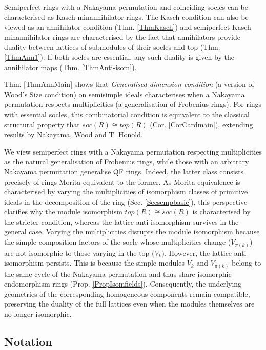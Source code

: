 \documentclass[11pt]{article}
\theoremstyle{plain}
\theoremstyle{remark}
\theoremstyle{plain}
\begin{document}
Semiperfect rings with a Nakayama permutation and coinciding socles can be characterised as Kasch minannihilator rings. The Kasch condition can also be viewed as an annihilator condition  (Thm. \ref{ThmKasch}) and semiperfect Kasch minannihilator rings are characterised by the fact that annihilators provide duality between lattices of submodules of their socles and top (Thm. \ref{ThmAnn1}). If both socles are essential, any such duality is given by the annihilator maps (Thm. \ref{ThmAnti-isom}). 

 Thm. \ref{ThmAnnMain} shows that \textit{Generalised dimension condition} (a version of Wood's Size condition) on semisimple ideals characterises when a Nakayama permutation respects multiplicities (a generalisation of Frobenius rings). For rings with essential socles, this combinatorial condition is equivalent to the classical structural property that $soc(R)\cong top(R)$ (Cor. \ref{CorCardmain}), extending results by Nakayama, Wood and T. Honold.

We view semiperfect rings with a Nakayama permutation respecting multiplicities as the natural generalisation of Frobenius rings, while those with an arbitrary Nakayama permutation generalise QF rings. Indeed, the latter class consists precisely of rings Morita equivalent to the former. As Morita equivalence is characterised by varying the multiplicities of isomorphism classes of primitive ideals in the decomposition of the ring (Sec. \ref{Secsempbasic}), this perspective clarifies why the module isomorphism $top(R) \cong soc(R)$ is characterised by the stricter condition, whereas the lattice anti-isomorphism survives in the general case. Varying the multiplicities disrupts the module isomorphism because the simple composition factors of the socle whose multiplicities change ($V_{\pi(k)}$) are not isomorphic to those varying in the top ($V_k$). However, the lattice anti-isomorphism persists. This is because the simple modules $V_k$ and $V_{\pi(k)}$ belong to the same cycle of the Nakayama permutation and thus share isomorphic endomorphism rings (Prop. \ref{PropIsomfields}). Consequently, the underlying geometries of the corresponding homogeneous components remain compatible, preserving the duality of the full lattices even when the modules themselves are no longer isomorphic.


\subsection{Notation}
\end{document}
